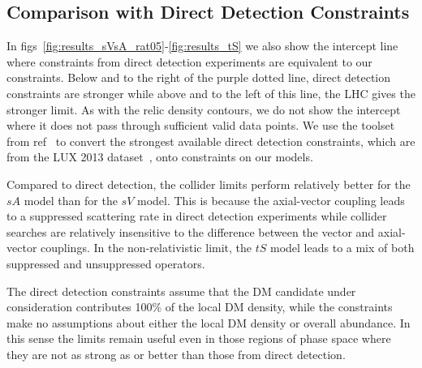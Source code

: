 \subsection{Comparison with Direct Detection Constraints}

In figs~\ref{fig:results_sVsA_rat05}-\ref{fig:results_tS} we also show the intercept line where constraints from direct detection experiments are equivalent to our \monoX constraints. Below and to the right of the purple dotted line, direct detection constraints are stronger while above and to the left of this line, the LHC gives the stronger limit. As with the relic density contours, we do not show the intercept where it does not pass through sufficient valid data points. We use the toolset from ref~\cite{DelNobile:2013sia} to convert the strongest available direct detection constraints, which are from the LUX 2013 dataset~\cite{Akerib:2013tjd}, onto constraints on our models.

Compared to direct detection, the \monoX collider limits perform relatively better for the $sA$ model than for the $sV$ model. This is because the axial-vector coupling leads to a suppressed scattering rate in direct detection experiments while collider searches are relatively insensitive to the difference between the vector and axial-vector couplings. In the non-relativistic limit, the $tS$ model leads to a mix of both suppressed and unsuppressed operators.

The direct detection constraints assume that the DM candidate under consideration contributes 100\% of the local DM density, while the \monoX constraints make no assumptions about either the local DM density or overall abundance. In this sense the \monoX limits remain useful even in those regions of phase space where they are not as strong as or better than those from direct detection.
